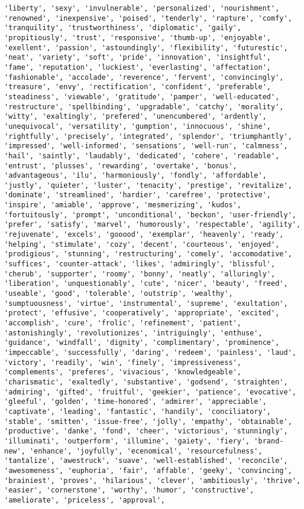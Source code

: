 \documentclass[11pt]{article}
\begin{document}
\begin{Verbatim}[commandchars=\\\{\}]
'liberty', 'sexy', 'invulnerable', 'personalized', 'nourishment', 'renowned', 'inexpensive', 'poised', 'tenderly', 'rapture', 'comfy', 'tranquility', 'trustworthiness', 'diplomatic', 'gaily', 'propitiously', 'trust', 'responsive', 'thumb-up', 'enjoyable', 'exellent', 'passion', 'astoundingly', 'flexibility', 'futurestic', 'neat', 'variety', 'soft', 'pride', 'innovation', 'insightful', 'fame', 'reputation', 'luckiest', 'everlasting', 'affectation', 'fashionable', 'accolade', 'reverence', 'fervent', 'convincingly', 'treasure', 'envy', 'rectification', 'confident', 'preferable', 'steadiness', 'viewable', 'gratitude', 'pamper', 'well-educated', 'restructure', 'spellbinding', 'upgradable', 'catchy', 'morality', 'witty', 'exaltingly', 'prefered', 'unencumbered', 'ardently', 'unequivocal', 'versatility', 'gumption', 'innocuous', 'shine', 'rightfully', 'precisely', 'integrated', 'splendor', 'triumphantly', 'impressed', 'well-informed', 'sensations', 'well-run', 'calmness', 'hail', 'saintly', 'laudably', 'dedicated', 'cohere', 'readable', 'entrust', 'plusses', 'rewarding', 'overtake', 'bonus', 'advantageous', 'ilu', 'harmoniously', 'fondly', 'affordable', 'justly', 'quieter', 'luster', 'tenacity', 'prestige', 'revitalize', 'dominate', 'streamlined', 'hardier', 'carefree', 'protective', 'inspire', 'amiable', 'approve', 'mesmerizing', 'kudos', 'fortuitously', 'prompt', 'unconditional', 'beckon', 'user-friendly', 'prefer', 'satisfy', 'marvel', 'humorously', 'respectable', 'agility', 'rejuvenate', 'excels', 'gooood', 'exemplar', 'heavenly', 'ready', 'helping', 'stimulate', 'cozy', 'decent', 'courteous', 'enjoyed', 'prodigious', 'stunning', 'restructuring', 'comely', 'accomodative', 'suffices', 'counter-attack', 'likes', 'admiringly', 'blissful', 'cherub', 'supporter', 'roomy', 'bonny', 'neatly', 'alluringly', 'liberation', 'unquestionably', 'cute', 'nicer', 'beauty', 'freed', 'useable', 'good', 'tolerable', 'outstrip', 'wealthy', 'sumptuousness', 'virtue', 'instrumental', 'supreme', 'exultation', 'protect', 'effusive', 'cooperatively', 'appropriate', 'excited', 'accomplish', 'cure', 'frolic', 'refinement', 'patient', 'astonishingly', 'revolutionizes', 'intriguingly', 'enthuse', 'guidance', 'windfall', 'dignity', 'complimentary', 'prominence', 'impeccable', 'successfully', 'daring', 'redeem', 'painless', 'laud', 'victory', 'readily', 'win', 'finely', 'impressiveness', 'complements', 'preferes', 'vivacious', 'knowledgeable', 'charismatic', 'exaltedly', 'substantive', 'godsend', 'straighten', 'admiring', 'gifted', 'fruitful', 'geekier', 'patience', 'evocative', 'gleeful', 'golden', 'time-honored', 'admirer', 'appreciable', 'captivate', 'leading', 'fantastic', 'handily', 'conciliatory', 'stable', 'smitten', 'issue-free', 'jolly', 'empathy', 'obtainable', 'productive', 'danke', 'fond', 'cheer', 'victorious', 'stunningly', 'illuminati', 'outperform', 'illumine', 'gaiety', 'fiery', 'brand-new', 'enhance', 'joyfully', 'ecenomical', 'resourcefulness', 'tantalize', 'awestruck', 'suave', 'well-established', 'reconcile', 'awesomeness', 'euphoria', 'fair', 'affable', 'geeky', 'convincing', 'brainiest', 'proves', 'hilarious', 'clever', 'ambitiously', 'thrive', 'easier', 'cornerstone', 'worthy', 'humor', 'constructive', 'ameliorate', 'priceless', 'approval', 
\end{Verbatim}
\end{document}
